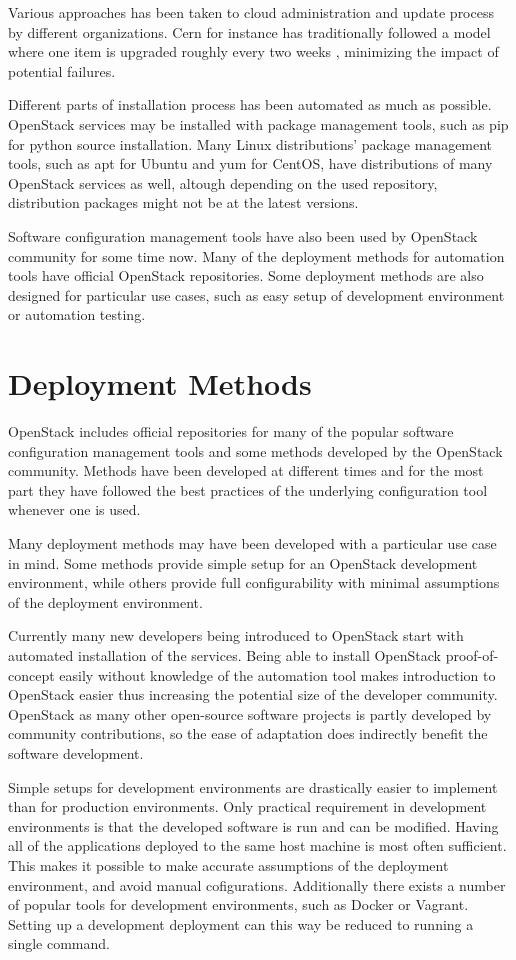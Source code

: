 \documentclass[officiallayout]{tktla}
\begin{document}
Various approaches has been taken to cloud administration and update process by
different organizations. Cern for instance has traditionally followed a model
where one item is upgraded roughly every two weeks \cite{cern}, minimizing the
impact of potential failures.

Different parts of installation process has been automated as much as possible.
OpenStack services may be installed with package management tools, such as pip
for python source installation. Many Linux distributions' package management
tools, such as apt for Ubuntu and yum for CentOS, have distributions of many
OpenStack services as well, altough depending on the used repository,
distribution packages might not be at the latest versions.

Software configuration management tools have also been used by OpenStack
community for some time now. Many of the deployment methods for automation
tools have official OpenStack repositories. Some deployment methods are also
designed for particular use cases, such as easy setup of development
environment or automation testing.

\section{Deployment Methods}

OpenStack includes official repositories for many of the popular software
configuration management tools and some methods developed by the OpenStack
community. Methods have been developed at different times and for the most part
they have followed the best practices of the underlying configuration tool
whenever one is used.

Many deployment methods may have been developed with a particular use case in
mind. Some methods provide simple setup for an OpenStack development
environment, while others provide full configurability with minimal assumptions
of the deployment environment.

Currently many new developers being introduced to OpenStack start with
automated installation of the services. Being able to install OpenStack
proof-of-concept easily without knowledge of the automation tool makes
introduction to OpenStack easier thus increasing the potential size of the
developer community. OpenStack as many other open-source software projects is
partly developed by community contributions, so the ease of adaptation does
indirectly benefit the software development.

Simple setups for development environments are drastically easier to implement
than for production environments. Only practical requirement in development
environments is that the developed software is run and can be modified. Having
all of the applications deployed to the same host machine is most often
sufficient. This makes it possible to make accurate assumptions of the
deployment environment, and avoid manual cofigurations. Additionally there
exists a number of popular tools for development environments, such as Docker
or Vagrant. Setting up a development deployment can this way be reduced to
running a single command.
\end{document}
